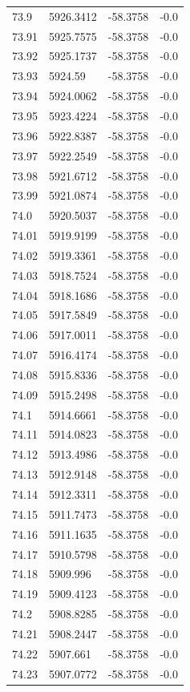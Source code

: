 \begin{table}[H]
\begin{tabular}{llll}
73.9 & 5926.3412 & -58.3758 & -0.0 \\
73.91 & 5925.7575 & -58.3758 & -0.0 \\
73.92 & 5925.1737 & -58.3758 & -0.0 \\
73.93 & 5924.59 & -58.3758 & -0.0 \\
73.94 & 5924.0062 & -58.3758 & -0.0 \\
73.95 & 5923.4224 & -58.3758 & -0.0 \\
73.96 & 5922.8387 & -58.3758 & -0.0 \\
73.97 & 5922.2549 & -58.3758 & -0.0 \\
73.98 & 5921.6712 & -58.3758 & -0.0 \\
73.99 & 5921.0874 & -58.3758 & -0.0 \\
74.0 & 5920.5037 & -58.3758 & -0.0 \\
74.01 & 5919.9199 & -58.3758 & -0.0 \\
74.02 & 5919.3361 & -58.3758 & -0.0 \\
74.03 & 5918.7524 & -58.3758 & -0.0 \\
74.04 & 5918.1686 & -58.3758 & -0.0 \\
74.05 & 5917.5849 & -58.3758 & -0.0 \\
74.06 & 5917.0011 & -58.3758 & -0.0 \\
74.07 & 5916.4174 & -58.3758 & -0.0 \\
74.08 & 5915.8336 & -58.3758 & -0.0 \\
74.09 & 5915.2498 & -58.3758 & -0.0 \\
74.1 & 5914.6661 & -58.3758 & -0.0 \\
74.11 & 5914.0823 & -58.3758 & -0.0 \\
74.12 & 5913.4986 & -58.3758 & -0.0 \\
74.13 & 5912.9148 & -58.3758 & -0.0 \\
74.14 & 5912.3311 & -58.3758 & -0.0 \\
74.15 & 5911.7473 & -58.3758 & -0.0 \\
74.16 & 5911.1635 & -58.3758 & -0.0 \\
74.17 & 5910.5798 & -58.3758 & -0.0 \\
74.18 & 5909.996 & -58.3758 & -0.0 \\
74.19 & 5909.4123 & -58.3758 & -0.0 \\
74.2 & 5908.8285 & -58.3758 & -0.0 \\
74.21 & 5908.2447 & -58.3758 & -0.0 \\
74.22 & 5907.661 & -58.3758 & -0.0 \\
74.23 & 5907.0772 & -58.3758 & -0.0 \\

\end{tabular}
\end{table}
